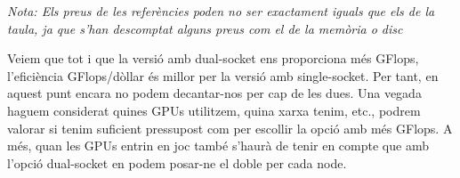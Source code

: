 \begin{table}[H]
\begin{adjustwidth}{-.5in}{-.5in}  
    \begin{center}
    \centering
\end{center}
    \end{adjustwidth}
    \caption{Comparació entre les diferents configuracions dels nodes.}
    \label{tab_web_plaques_cmp}
\end{table}
\vspace{-0.75cm} %
\textit{Nota: Els preus de les referències poden no ser exactament iguals que els de la taula, ja que s'han descomptat alguns preus com el de la memòria o disc}

Veiem que tot i que la versió amb dual-socket ens proporciona més GFlops, l'eficiència GFlops/dòllar és millor per la versió amb single-socket. Per tant, en aquest punt encara no podem decantar-nos per cap de les dues. Una vegada haguem considerat quines GPUs utilitzem, quina xarxa tenim, etc., podrem valorar si tenim suficient pressupost com per escollir la opció amb més GFlops. A més, quan les GPUs entrin en joc també s'haurà de tenir en compte que amb l'opció dual-socket en podem posar-ne el doble per cada node.

